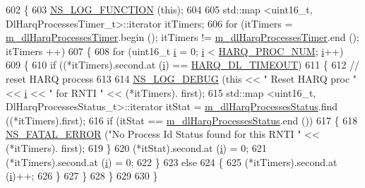 \begin{DoxyCode}
602 \{
603   \hyperlink{log-macros-disabled_8h_a90b90d5bad1f39cb1b64923ea94c0761}{NS\_LOG\_FUNCTION} (\textcolor{keyword}{this});
604 
605   std::map <uint16\_t, DlHarqProcessesTimer\_t>::iterator itTimers;
606   \textcolor{keywordflow}{for} (itTimers = \hyperlink{classns3_1_1FdMtFfMacScheduler_ae68e481ecd9623d2eb74461160c8543b}{m\_dlHarqProcessesTimer}.begin (); itTimers != 
      \hyperlink{classns3_1_1FdMtFfMacScheduler_ae68e481ecd9623d2eb74461160c8543b}{m\_dlHarqProcessesTimer}.end (); itTimers ++)
607     \{
608       \textcolor{keywordflow}{for} (uint16\_t \hyperlink{bernuolliDistribution_8m_a6f6ccfcf58b31cb6412107d9d5281426}{i} = 0; \hyperlink{bernuolliDistribution_8m_a6f6ccfcf58b31cb6412107d9d5281426}{i} < \hyperlink{cqa-ff-mac-scheduler_8h_a9185d8d7d2b2979181d4a7044a3d3555}{HARQ\_PROC\_NUM}; \hyperlink{bernuolliDistribution_8m_a6f6ccfcf58b31cb6412107d9d5281426}{i}++)
609         \{
610           \textcolor{keywordflow}{if} ((*itTimers).second.at (\hyperlink{bernuolliDistribution_8m_a6f6ccfcf58b31cb6412107d9d5281426}{i}) == \hyperlink{cqa-ff-mac-scheduler_8h_add9e0c4889dc1b5b25686480b31ad166}{HARQ\_DL\_TIMEOUT})
611             \{
612               \textcolor{comment}{// reset HARQ process}
613               
614               \hyperlink{group__logging_ga413f1886406d49f59a6a0a89b77b4d0a}{NS\_LOG\_DEBUG} (\textcolor{keyword}{this} << \textcolor{stringliteral}{" Reset HARQ proc "} << \hyperlink{bernuolliDistribution_8m_a6f6ccfcf58b31cb6412107d9d5281426}{i} << \textcolor{stringliteral}{" for RNTI "} << (*itTimers).
      first);
615               std::map <uint16\_t, DlHarqProcessesStatus\_t>::iterator itStat = 
      \hyperlink{classns3_1_1FdMtFfMacScheduler_a9da9ca73b704b7386f3b751274e1f3e5}{m\_dlHarqProcessesStatus}.find ((*itTimers).first);
616               \textcolor{keywordflow}{if} (itStat == \hyperlink{classns3_1_1FdMtFfMacScheduler_a9da9ca73b704b7386f3b751274e1f3e5}{m\_dlHarqProcessesStatus}.end ())
617                 \{
618                   \hyperlink{group__fatal_ga5131d5e3f75d7d4cbfd706ac456fdc85}{NS\_FATAL\_ERROR} (\textcolor{stringliteral}{"No Process Id Status found for this RNTI "} << (*itTimers).
      first);
619                 \}
620               (*itStat).second.at (\hyperlink{bernuolliDistribution_8m_a6f6ccfcf58b31cb6412107d9d5281426}{i}) = 0;
621               (*itTimers).second.at (\hyperlink{bernuolliDistribution_8m_a6f6ccfcf58b31cb6412107d9d5281426}{i}) = 0;
622             \}
623           \textcolor{keywordflow}{else}
624             \{
625               (*itTimers).second.at (\hyperlink{bernuolliDistribution_8m_a6f6ccfcf58b31cb6412107d9d5281426}{i})++;
626             \}
627         \}
628     \}
629   
630 \}
\end{DoxyCode}


